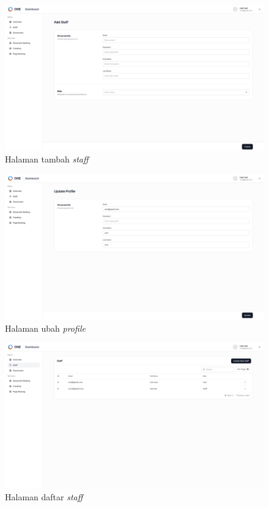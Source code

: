 \documentclass[
	a4paper, %
	10pt, %
	unnumberedsections, %
	twoside, %
]{LTJournalArticle}
\begin{document}
\begin{figure}[H]
	\includegraphics[width=\linewidth]{view_staff_add.png}
	\caption{Halaman tambah \textit{staff}}
	\label{gambar:staff_add}
\end{figure}
\begin{figure}[H]
\includegraphics[width=\linewidth]{view_staff_edit.png}
\caption{Halaman ubah \textit{profile}}
\label{gambar:staff_edit}
\end{figure}
\begin{figure}[H]
\includegraphics[width=\linewidth]{view_staff_list.png}
\caption{Halaman daftar \textit{staff}}
\label{gambar:staff_list}
\end{figure}
\end{document}
